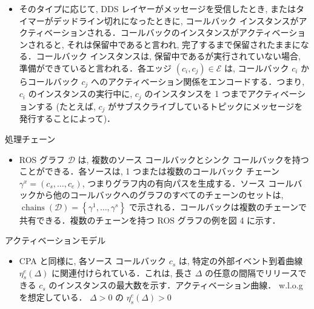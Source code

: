 \begin{frame}{}
    \begin{itemize}
        \item そのタイプに応じて, DDS レイヤーがメッセージを受信したとき, またはタイマーがデッドライン切れになったときに, コールバック インスタンスがアクティベーションされる．コールバックのインスタンスがアクティベーションされると, それは保留中であると言われ, 完了するまで保留されたままになる．コールバック インスタンスは, 保留中であるが実行されていない場合, 準備ができていると言われる．各エッジ $\left(c_{i}, c_{j}\right) \in \mathcal{E}$ は, コールバック $c_{i}$ からコールバック $c_{j}$ へのアクティベーション関係をエンコードする．つまり, $c_{i}$ のインスタンスの実行中に, $c_{j}$ のインスタンスを 1 つまでアクティベーションする (たとえば, $c_{j}$ がサブスクライブしているトピックにメッセージを発行することによって)．
    \end{itemize}
\end{frame}

\begin{frame}{処理チェーン}
    \begin{itemize}
        \item ROS グラフ $\mathcal{D}$ は, 複数のソース コールバックとシンク コールバックを持つことができる．各ソースは, 1 つまたは複数のコールバック チェーン $\gamma^{x}=\left(c_{s}, \ldots, c_{e}\right)$, つまりグラフ内の有向パスを生成する．ソース コールバックから他のコールバックへのグラフのすべてのチェーンのセットは, $\operatorname{chains}(\mathcal{D})=\left\{\gamma^{1}, \ldots, \gamma^{s}\right\}$ で示される．コールバックは複数のチェーンで共有できる．複数のチェーンを持つ ROS グラフの例を図 4 に示す．
    \end{itemize}
\end{frame}

\begin{frame}{アクティベーションモデル}
    \begin{itemize}
        \item CPA と同様に, 各ソース コールバック $c_{s}$ は, 特定の外部イベント到着曲線 $\eta_{s}^{e}(\Delta)$ に関連付けられている．これは, 長さ $\Delta$ の任意の間隔でリリースできる $c_{s}$ のインスタンスの最大数を示す．アクティベーション曲線． w.l.o.gを想定している． $\Delta>0$ の $\eta_{s}^{e}(\Delta)>0$
    \end{itemize}
\end{frame}

